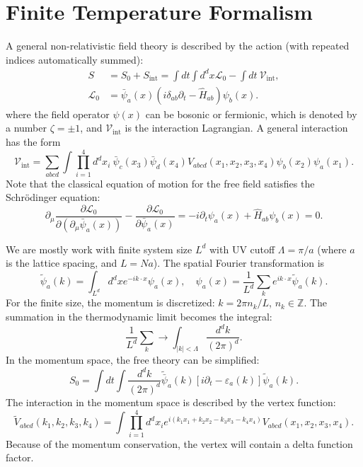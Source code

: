 \documentclass[aps,prb,superscriptaddress,nofootinbib]{revtex4}
\begin{document}
\section{Finite Temperature Formalism}
A general non-relativistic field theory is described by the action (with repeated indices automatically summed):
\begin{equation}
\begin{aligned}
	S &= S_0 + S_{\mathrm{int}} = \int dt \int d^d x \mathcal{L}_0 - \int dt\ \mathcal{V}_{\mathrm{int}}, \\
	\mathcal{L}_0 &= \bar\psi_a(x) (i\delta_{ab}\partial_t-\hat H_{ab})\psi_b(x).
\end{aligned}
\end{equation}
where the field operator $\psi(x)$ can be bosonic or fermionic, which is denoted by a number $\zeta=\pm 1$, and $\mathcal{V}_{\mathrm{int}}$ is the interaction Lagrangian.
A general interaction has the form
\begin{equation}
	\mathcal{V}_{\mathrm{int}} = \sum_{abcd}\int \prod_{i=1}^4 d^d x_i \ \bar\psi_{c}(x_3)\bar\psi_{d}(x_4) V_{abcd}(x_1,x_2,x_3,x_4) \psi_{b}(x_2)\psi_{a}(x_1).
\end{equation}
Note that the classical equation of motion for the free field satisfies the Schr\"{o}dinger equation:
\begin{equation}
	\partial_\mu \frac{\partial \mathcal L_0}{\partial(\partial_\mu \bar\psi_a(x))} - \frac{\partial \mathcal L_0}{\partial\bar{\psi}_a(x)} 
	= - i\partial_t \psi_a(x) + \hat H_{ab}\psi_b(x) = 0.
\end{equation}

We are mostly work with finite system size $L^d$ with UV cutoff $\Lambda = \pi/a$ (where $a$ is the lattice spacing, and $L = Na$). The spatial Fourier transformation is
\begin{equation}
	\tilde{\psi}_a(k) = \int_{L^d} d^dx e^{-i k \cdot x}\psi_a(x), \quad
	\psi_a(x) = \frac{1}{L^d}\sum_{k} e^{i k \cdot x}\tilde{\psi}_a(k).
\end{equation}
For the finite size, the momentum is discretized: $k = 2\pi n_k/L$, $n_k \in \mathbb Z$.
The summation in the thermodynamic limit becomes the integral:
\begin{equation}
	\frac{1}{L^d}\sum_k \longrightarrow \int_{|k|<\Lambda} \frac{d^dk}{(2\pi)^d}.
\end{equation}
In the momentum space, the free theory can be simplified:
\begin{equation}
	S_0 = \int dt \int \frac{d^d k}{(2\pi)^d} \tilde{\bar\psi}_a(k) [i\partial_t-\varepsilon_a(k)]\tilde{\psi}_a(k).
\end{equation}
The interaction in the momentum space is described by the vertex function:
\begin{equation}
	\tilde V_{abcd}(k_1,k_2,k_3,k_4)
	= \int \prod_{i=1}^4 d^d x_i e^{i(k_1x_1+k_2x_2-k_3x_3-k_4x_4)} V_{abcd}(x_1,x_2,x_3,x_4).
\end{equation}
Because of the momentum conservation, the vertex will contain a delta function factor.
\end{document}
